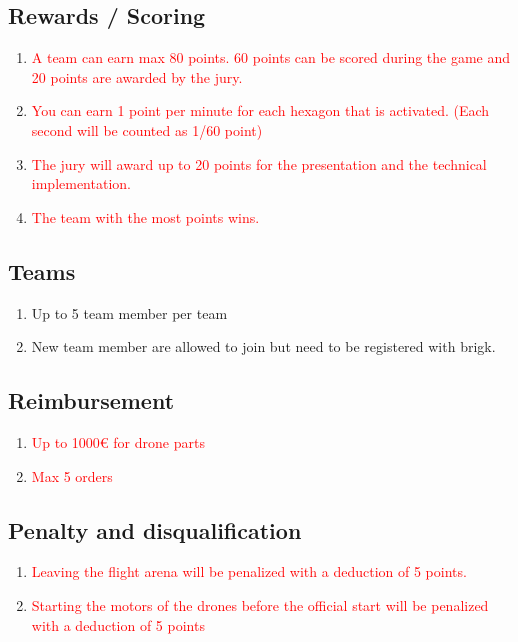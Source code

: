 \subsection{Rewards / Scoring}
\begin{enumerate}
	\item{\textcolor{red}{A team can earn max 80 points. 60 points can be scored during the game and 20 points are awarded by the jury.}}
	\item{\textcolor{red}{You can earn 1 point per minute for each hexagon that is activated. (Each second will be counted as 1/60 point)}}
	\item{\textcolor{red}{The jury will award up to 20 points for the presentation and the technical implementation.}}
	\item{\textcolor{red}{The team with the most points wins.}}
\end{enumerate}

\subsection{Teams}
\begin{enumerate}
	\item{Up to 5 team member per team}
	\item{New team member are allowed to join but need to be registered with brigk.}
\end{enumerate}

\subsection{Reimbursement}
\begin{enumerate}
	\item{\textcolor{red}{Up to 1000€ for drone parts}}
	\item{\textcolor{red}{Max 5 orders}}
\end{enumerate}

\subsection{Penalty and disqualification}
\begin{enumerate}
	\item{\textcolor{red}{Leaving the flight arena will be penalized with a deduction of 5 points.}}
	\item{\textcolor{red}{Starting the motors of the drones before the official start will be penalized with a deduction of 5 points }}
\end{enumerate}

